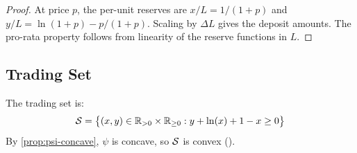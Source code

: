 \begin{proof}
At price $p$, the per-unit reserves are $x/L = 1/(1+p)$ and $y/L = \ln(1+p) - p/(1+p)$.
Scaling by $\Delta L$ gives the deposit amounts. The pro-rata property follows from
linearity of the reserve functions in $L$. \qedhere
\end{proof}

\subsection{Trading Set}

\begin{definition}\label{def:trading-set}
The trading set is:
\begin{equation}\label{eq:trading-set}
  \mathcal{S} = \bigl\{(x, y) \in \mathbb{R}_{>0} \times \mathbb{R}_{\geq 0}
  : y + \ln(x) + 1 - x \geq 0 \bigr\}
\end{equation}
By \cref{prop:psi-concave}, $\psi$ is concave, so $\mathcal{S}$ is convex
(\cite[Theorem~1]{angeris2023geometry}).
\end{definition}

